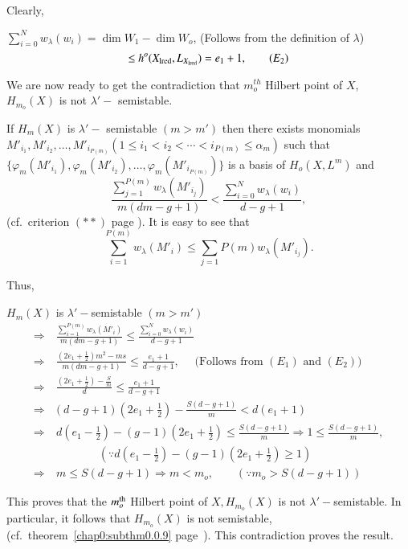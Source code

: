 \noindent
Clearly,

\noindent
$\sum\limits^{N}_{i = 0} w_\lambda (w_i) = \dim W_1 - \dim W_o$, \; 
(Follows from the definition of $\lambda$) 
\begin{equation*}
\le h^o (X_{\rm lred}, L_{X_{\rm lred}}) = e_1 + 1, \tag{$E_2$}
\end{equation*}

\noindent
We are now ready to get the contradiction that $m_o^{th}$ Hilbert
point of $X$, $H_{m_o}(X)$ is not $\lambda'-$ semistable. 

If $H_m (X)$ is $\lambda' - $ semistable $(m > m')$ then there exists
monomials $M'_{i_1}, M'_{i_2}, \ldots , M'_{i_{P(m)}} (1 \le i_1 < i_2
< \cdots < i_{P (m)} \le \alpha_m)$ such that $\{ \varphi_m
(M'_{i_1}), \varphi_m(M'_{i_2}) , \ldots , \varphi_m (M'_{i_{P(m)}})
\}  $ is a basis of $H_o (X, L^m)$ and  
$$\dfrac{\sum\limits^{P(m)}_{j
    = 1} w_\lambda (M'_{i_j})}{m (dm-g+1)} < \dfrac{\sum\limits^{N}_{i
    = 0} w_\lambda (w_i)}{d - g + 1},$$ 
(cf.\ criterion $(**)$ page
\pageref{page10}). It is easy to see that 
$$\sum\limits^{P (m)}_{i = 1}
w_\lambda (M'_i) \le \sum\limits_{j = 1}{P (m)} w_\lambda (M'_{i_j}).$$ 


\medskip
Thus,\pageoriginale

\noindent
$H_m (X)$ is $\lambda' - $semistable $(m > m')$
\begin{align*}
\Rightarrow & ~ \frac {\sum\limits_{i = 1}^{P(m)} w_\lambda (M'_i)}{m
  (dm-g+1)} \le \frac{\sum\limits_{i = 0}^{N}w_\lambda (w_i)}{d -
  g+1}\\ 
\Rightarrow & ~ \frac{(2e_1 + \frac{1}{2}) m^2 - ms}{m(dm-g+1)} \leq
\frac{e_1+1}{d-g+1},  \quad \text{ (Follows from } (E_1) \text { and } (E_2))\\ 
\Rightarrow & ~ \frac{(2e_1 + \frac{1}{2}) - \frac{S}{m}}{d} \le
\frac{e_1 +1}{d - g + 1}\\ 
\Rightarrow& (d -g +1) (2e_1 + \frac{1}{2}) -
\frac{S(d-g+1)}{m} < d(e_1 + 1)\\ 
\Rightarrow & ~ d(e_1 - \frac{1}{2}) - (g-1) (2e_1 + \frac{1}{2}) \le
\frac{S (d-g+1)}{m} \Rightarrow 1 \le \frac{S(d-g+1)}{m}, \\
& \qquad \qquad  (\because
d(e_1 - \frac{1}{2}) - (g-1) (2e_1 + \frac{1}{2}) \ge 1)\\ 
\Rightarrow & ~ m \le S (d-g+1) \Rightarrow m < m_o, \qquad (\because
m_o > S(d-g+1))  
\end{align*}

This proves that the $m_o^{\rm th}$ Hilbert point of $X, H_{m_o}(X)$ is
not $\lambda' -$\break semistable. In particular, it follows that
$H_{m_o}(X) $ is not semistable, (cf.\ theorem~\ref{chap0:subthm0.0.9}
page~\pageref{chap0:subthm0.0.9}). This contradiction proves the result. 

